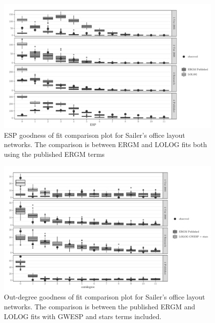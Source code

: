 \documentclass[
]{statsoc}
\begin{document}
\begin{figure}[H]

{\centering \includegraphics{lolog_catalog_files/figure-latex/unnamed-chunk-10-1} 

}

\caption{\label{fig:sailer_gof_pub_esp} ESP goodness of fit comparison plot for Sailer's office layout networks. The comparison is between ERGM and LOLOG fits both using the published ERGM terms}\label{fig:unnamed-chunk-10}
\end{figure}

\begin{figure}[H]

{\centering \includegraphics{lolog_catalog_files/figure-latex/unnamed-chunk-11-1} 

}

\caption{\label{fig:sailer_gof_gwesp_star_odeg}Out-degree goodness of fit comparison plot for Sailer's office layout networks. The comparison is between the published ERGM and LOLOG fits with GWESP and stars terms included.}\label{fig:unnamed-chunk-11}
\end{figure}
\end{document}
